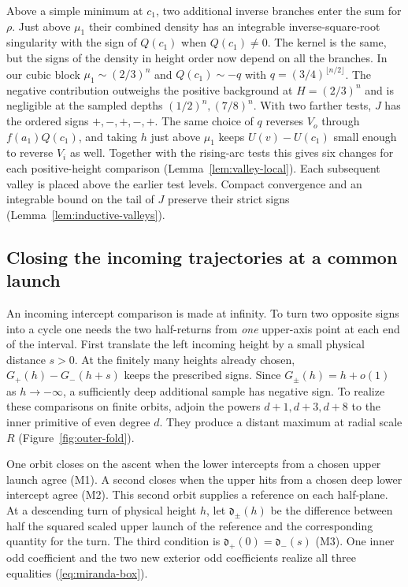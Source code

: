Above a simple minimum at $c_1$, two additional inverse branches enter
the sum for $\rho$. Just above $\mu_1$ their combined density has an
integrable inverse-square-root singularity with the sign of $Q(c_1)$
when $Q(c_1)\ne0$. The kernel is the same, but the signs of the
density in height order now depend on all the branches. In our cubic
block $\mu_1\sim(2/3)^n$ and $Q(c_1)\sim-q$ with
$q=(3/4)^{\lfloor n/2\rfloor}$. The negative contribution outweighs
the positive background at $H=(2/3)^n$ and is negligible at the sampled
depths $(1/2)^n,(7/8)^n$. With two farther tests, $J$ has the ordered
signs $+,-,+,-,+$. The same choice of $q$ reverses $V_o$ through
$f(a_1)Q(c_1)$, and taking $h$ just above $\mu_1$ keeps
$U(v)-U(c_1)$ small enough to reverse $V_i$ as well.
Together with the rising-arc tests this gives six changes for each
positive-height comparison (Lemma~\ref{lem:valley-local}).
Each subsequent valley is placed above the earlier test levels.
Compact convergence and an integrable bound on the tail of $J$ preserve
their strict signs (Lemma~\ref{lem:inductive-valleys}).

\subsection{Closing the incoming trajectories at a common launch}
An incoming intercept comparison is made at infinity. To turn two
opposite signs into a cycle one needs the two half-returns from
\emph{one} upper-axis point at each end of the interval. First translate
the left incoming height by a small physical distance $s>0$. At the
finitely many heights already chosen, $G_+(h)-G_-(h+s)$ keeps the
prescribed signs. Since $G_\pm(h)=h+o(1)$ as $h\to-\infty$, a
sufficiently deep additional sample has negative sign. To realize
these comparisons on finite orbits, adjoin the powers $d+1,d+3,d+8$
to the inner primitive of even degree $d$. They produce a distant
maximum at radial scale $R$ (Figure~\ref{fig:outer-fold}).



One orbit closes on the ascent when the lower intercepts from a chosen
upper launch agree (M1). A second closes when the upper hits from a
chosen deep lower intercept agree (M2). This second orbit supplies a
reference on each half-plane. At a descending turn of physical height
$h$, let $\mathfrak d_\pm(h)$ be the difference between half the squared
scaled upper launch of the reference and the corresponding quantity for
the turn. The third condition is $\mathfrak d_+(0)=\mathfrak d_-(s)$
(M3). One inner odd coefficient and the two new exterior odd
coefficients realize all three equalities (\eqref{eq:miranda-box}).

